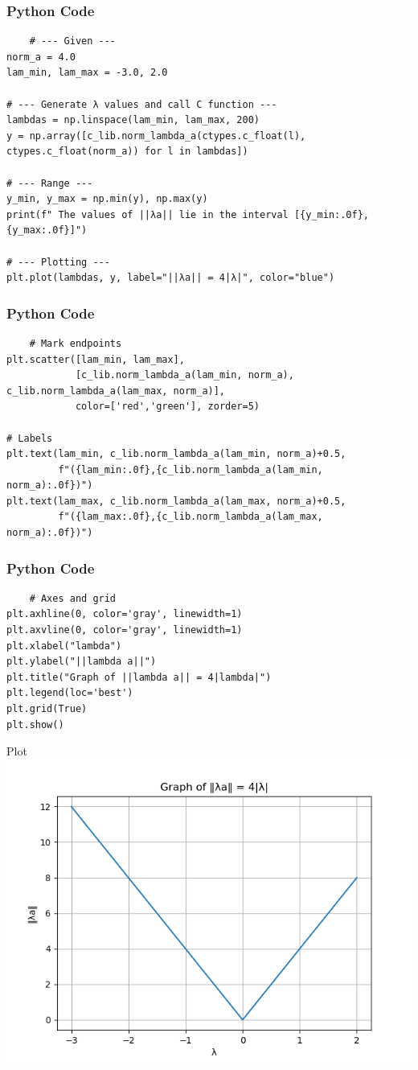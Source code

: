 \documentclass{beamer}
\begin{document}
\begin{frame}[fragile]
    \frametitle{Python Code}
    \begin{lstlisting}
    # --- Given ---
norm_a = 4.0
lam_min, lam_max = -3.0, 2.0

# --- Generate λ values and call C function ---
lambdas = np.linspace(lam_min, lam_max, 200)
y = np.array([c_lib.norm_lambda_a(ctypes.c_float(l), ctypes.c_float(norm_a)) for l in lambdas])

# --- Range ---
y_min, y_max = np.min(y), np.max(y)
print(f" The values of ||λa|| lie in the interval [{y_min:.0f}, {y_max:.0f}]")

# --- Plotting ---
plt.plot(lambdas, y, label="||λa|| = 4|λ|", color="blue")
    \end{lstlisting}
\end{frame}

\begin{frame}[fragile]
    \frametitle{Python Code}
    \begin{lstlisting}
    # Mark endpoints
plt.scatter([lam_min, lam_max],
            [c_lib.norm_lambda_a(lam_min, norm_a), c_lib.norm_lambda_a(lam_max, norm_a)],
            color=['red','green'], zorder=5)

# Labels
plt.text(lam_min, c_lib.norm_lambda_a(lam_min, norm_a)+0.5,
         f"({lam_min:.0f},{c_lib.norm_lambda_a(lam_min, norm_a):.0f})")
plt.text(lam_max, c_lib.norm_lambda_a(lam_max, norm_a)+0.5,
         f"({lam_max:.0f},{c_lib.norm_lambda_a(lam_max, norm_a):.0f})")
    \end{lstlisting}
\end{frame}

\begin{frame}[fragile]
    \frametitle{Python Code}
    \begin{lstlisting}
    # Axes and grid
plt.axhline(0, color='gray', linewidth=1)
plt.axvline(0, color='gray', linewidth=1)
plt.xlabel("lambda")
plt.ylabel("||lambda a||")
plt.title("Graph of ||lambda a|| = 4|lambda|")
plt.legend(loc='best')
plt.grid(True)
plt.show()
    \end{lstlisting}
\end{frame}


\begin{frame}{Plot}
    \centering
    \includegraphics[width=\columnwidth, height=0.8\textheight, keepaspectratio]{Figs/Fig1.png}     
\end{frame}
\end{document}
